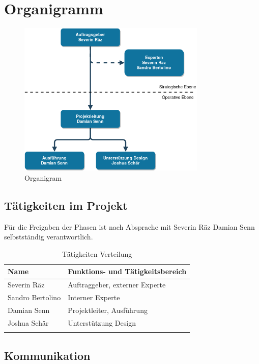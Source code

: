 \clearpage

\section{Organigramm}\label{organigramm}

\begin{figure}[!htb]
  \centering
  \includegraphics[width=0.8\textwidth]{figures/organigram.png}
  \caption{Organigram}
\end{figure}

\subsection{Tätigkeiten im Projekt}\label{tuxe4tigkeiten-im-projekt}

Für die Freigaben der Phasen ist nach Absprache mit Severin Räz Damian Senn
selbstständig verantwortlich.

\begin{longtable}[]{@{}ll@{}}
  \toprule
  \textbf{Name}    & \textbf{Funktions- und Tätigkeitsbereich}\tabularnewline
  \midrule
  \endhead
  Severin Räz      & Auftraggeber, externer Experte\tabularnewline
  Sandro Bertolino & Interner Experte\tabularnewline
  Damian Senn      & Projektleiter, Ausführung\tabularnewline
  Joshua Schär     & Unterstützung Design\tabularnewline
  \bottomrule
  \caption{Tätigkeiten Verteilung}
\end{longtable}

\subsection{Kommunikation}\label{kommunikation}

